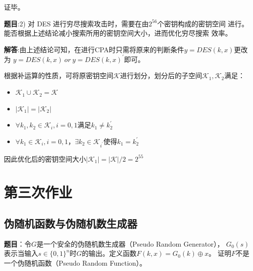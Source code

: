 证毕。

\textbf{题目}:2) 对 DES 进行穷尽搜索攻击时，需要在由$2^{56}$个密钥构成的密钥空间
进行。能否根据上述结论减小搜索所用的密钥空间大小，进而优化穷尽搜索
效率。

\textbf{解答}:由上述结论可知，在进行CPA时只需将原来的判断条件$y = DES(k, x)$更改为
$y = DES(k, x)~or~y = DES(k, x)^{\prime}$即可。

根据补运算的性质，可将原密钥空间$\mathcal{K}$进行划分，划分后的子空间$\mathcal{K}_1,\mathcal{K}_2$满足：
\begin{itemize}
    \item $\mathcal{K}_1\cup \mathcal{K}_2 = \mathcal{K}$
    \item $|\mathcal{K}_1|=|\mathcal{K}_2|$
    \item $\forall k_1, k_2 \in \mathcal{K}_i, i = 0, 1$满足$k_1 \neq k_2^{\prime}$
    \item $\forall k_1 \in \mathcal{K}_i, i = 0, 1$，$\exists k_2 \in \mathcal{K}_{i^\prime}$使得$k_1 = k_2^{\prime}$
\end{itemize}

因此优化后的密钥空间大小$|\mathcal{K}_1| = |\mathcal{K}| / 2 = 2^{55}$

\newpage

\chapter{第三次作业}

\section{伪随机函数与伪随机数生成器}

\textbf{题目}：令$G$是一个安全的伪随机数生成器（Pseudo Random Generator），
$G_0(s)$表示当输入$s \in\{0, 1\}^n$时$G$的输出。定义函数$F(k, x) = G_0(k) \oplus x$。
证明$F$不是一个伪随机函数（Pseudo Random Function）。

